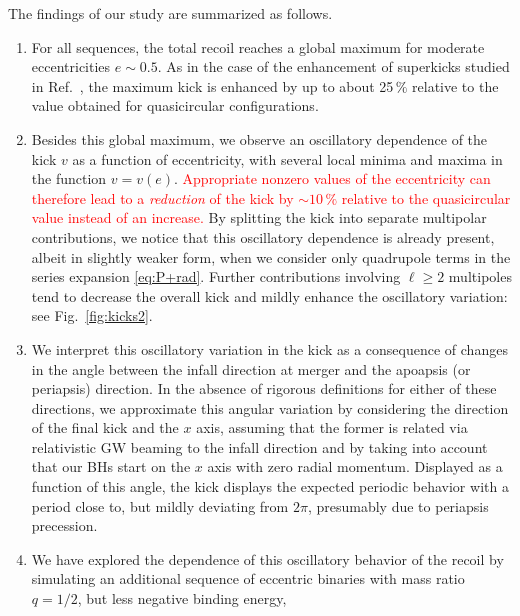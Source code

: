 \documentclass[floats,floatfix,showpacs,amssymb,prd,twocolumn,superscriptaddress,nofootinbib,nolongbibliography,reprint]{revtex4-2}
\newcounter{count}
\newcommand{\mr}[1]{{\textcolor{cyan}{\sf{[MR: #1]}} }}
\newcommand{\new}[1]{{\textcolor{red}{ #1} }}
\begin{document}
The findings of our study are summarized as follows.
%
\begin{enumerate}[label=(\roman*)]
 \item For all sequences, the total recoil reaches
 a global maximum for moderate eccentricities $e \sim 0.5$.
 As in the case of the enhancement of superkicks studied
 in Ref.~\cite{Sperhake:2019wwo}, the maximum kick is
 enhanced by up to about 25\,$\%$ relative to the value obtained
 for quasicircular configurations.
\item Besides this global maximum, we observe an oscillatory
  dependence of the kick $v$ as a function of eccentricity, with
  several local minima and maxima in the function $v = v(e)$. \new{Appropriate
  nonzero values of the eccentricity can therefore lead to a
  {\it reduction} of the kick by $\sim 10\,\%$ relative to the quasicircular
  value instead of an increase.} By
  splitting the kick into separate multipolar contributions, we notice
  that this oscillatory dependence is already present, albeit in
  slightly weaker form, when we consider only quadrupole terms in the
  series expansion \eqref{eq:P+rad}.  Further contributions involving
  $\ell \ge 2$ multipoles tend to decrease the overall kick and mildly
  enhance the oscillatory variation: see Fig.~\ref{fig:kicks2}.
 \item We interpret this oscillatory variation in the kick
 as a consequence of changes in the angle between the infall
 direction at merger and the apoapsis (or periapsis)
 direction. In the absence of rigorous definitions for either
 of these directions, we approximate this angular variation
 by considering the direction of the final kick and the
 $x$ axis, assuming that the former is related via relativistic
 GW beaming to the infall direction and by taking into account
 that our BHs start on the $x$ axis with zero radial momentum.
 Displayed as a function of this angle, the kick displays
 the expected periodic behavior with a period close to, but
 mildly deviating from $2\pi$, presumably due to periapsis
 precession.
 \item We have explored the dependence of this oscillatory behavior
 of the recoil by simulating an additional sequence of eccentric
 binaries with mass ratio $q=1/2$, but less negative binding energy,

\end{enumerate}
\end{document}
